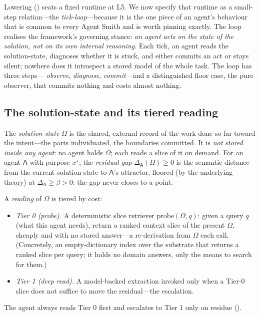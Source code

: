 \documentclass[11pt,twocolumn,a4paper]{article}
\newcommand{\Agent}{\mathsf{A}}
\newcommand{\floorc}{\beta}
\newcommand{\Purp}{x^{\star}}
\begin{document}
Lowering () seats a fixed runtime at L5. We now specify
that runtime as a small-step relation---the \emph{tick-loop}---because it is
the one piece of an agent's behaviour that is common to every Agent Smith and
is worth pinning exactly. The loop realises the framework's governing stance:
\emph{an agent acts on the state of the solution, not on its own internal
reasoning}. Each tick, an agent reads the solution-state, diagnoses whether
it is stuck, and either commits an act or stays silent; nowhere does it
introspect a stored model of the whole task. The loop has three steps---%
\emph{observe}, \emph{diagnose}, \emph{commit}---and a distinguished floor
case, the pure observer, that commits nothing and costs almost nothing.

\subsection{The solution-state and its tiered reading}

\begin{definition}
\label{def:solution-state}
The \emph{solution-state} $\Omega$ is the shared, external record of the work
done so far toward the intent---the parts individuated, the boundaries
committed. It is \emph{not stored inside any agent}: no agent holds $\Omega$;
each reads a slice of it on demand. For an agent $\Agent$ with purpose
$\Purp$, the \emph{residual gap} $\Delta_\Agent(\Omega)\ge0$ is the semantic
distance from the current solution-state to $\Agent$'s attractor, floored (by
the underlying theory) at $\Delta_\Agent\ge\floorc>0$: the gap never closes to
a point.
\end{definition}

\begin{definition}
\label{def:tiers}
A \emph{reading} of $\Omega$ is tiered by cost:
\begin{itemize}[leftmargin=*]
\item \emph{Tier 0 (probe).} A deterministic slice retriever
$\mathrm{probe}(\Omega,q)$: given a query $q$ (what this agent needs), return
a ranked context slice of the present $\Omega$, cheaply and with no stored
answer---a re-derivation from $\Omega$ each call. (Concretely, an
empty-dictionary index over the substrate that returns a ranked slice per
query; it holds no domain answers, only the means to search for them.)
\item \emph{Tier 1 (deep read).} A model-backed extraction invoked only when a
Tier-0 slice does not suffice to move the residual---the escalation.
\end{itemize}
The agent always reads Tier 0 first and escalates to Tier 1 only on residue
().
\end{definition}
\end{document}
